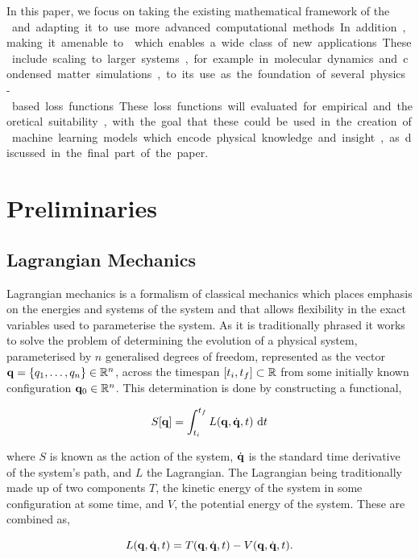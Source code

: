 In this paper, we focus on taking the existing mathematical framework of the \SI{} and adapting it to use more advanced computational methods. In addition, making it amenable to \autodiff{} which enables a wide class of new applications.
These include scaling to larger systems, for example in molecular dynamics and condensed matter simulations, to its use as the foundation of several physics-based loss functions. These loss functions will evaluated for empirical and theoretical suitability, with the goal that these could be used in the creation of machine learning models which encode physical knowledge and insight, as discussed in the final part of the paper.

\section{Preliminaries}

\subsection{Lagrangian Mechanics}
\label{sec:lag-mech}

Lagrangian mechanics is a formalism of classical mechanics which places emphasis on the energies and systems of the system and that allows flexibility in the exact variables used to parameterise the system.
As it is traditionally phrased it works to solve the problem of determining the evolution of a physical system, parameterised by $n$ generalised degrees of freedom, represented as the vector $\vb q = \left\{q_1, \dots, q_n\right\} \in \mathbb{R}^n$, across the timespan $[t_i, t_f] \subset \mathbb{R}$ from some initially known configuration $\vb q_0 \in \mathbb{R}^n$. This determination is done by constructing a functional,

\begin{equation}
  \label{eq:trad-action}
  S[\vb{q}] = \int_{t_i}^{t_f} L(\vb{q}, \dot{\vb{q}}, t) ~\mathrm{d} t
\end{equation}

where $S$ is known as the action of the system, $\dot{\vb{q}}$ is the standard time derivative of the system's path, and $L$ the Lagrangian. The Lagrangian being traditionally made up of two components $T$, the kinetic energy of the system in some configuration at some time, and $V$, the potential energy of the system. These are combined as,

\begin{equation}
  \label{eq:trad-lag}
  L(\vb{q}, \dot{\vb{q}}, t) = T(\vb{q}, \dot{\vb{q}}, t) - V(\vb{q}, \dot{\vb{q}}, t).
\end{equation}

